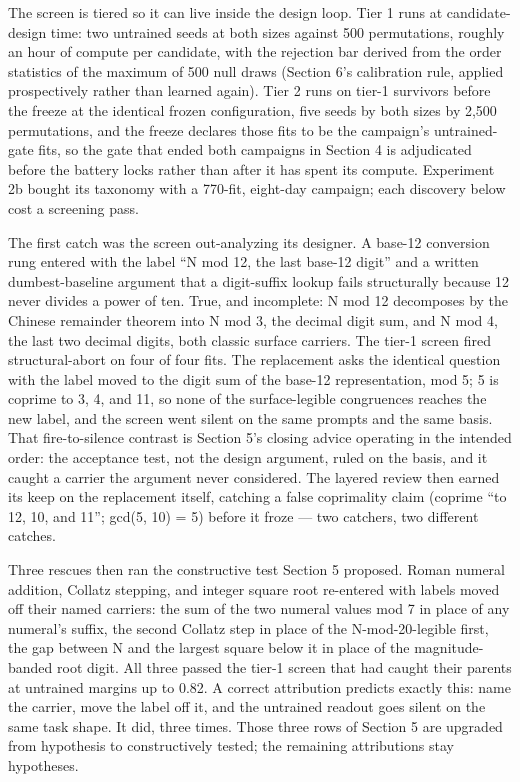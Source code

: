 The screen is tiered so it can live inside the design loop. Tier 1
runs at candidate-design time: two untrained seeds at both sizes
against 500 permutations, roughly an hour of compute per candidate,
with the rejection bar derived from the order statistics of the
maximum of 500 null draws (Section 6's calibration rule, applied
prospectively rather than learned again). Tier 2 runs on tier-1
survivors before the freeze at the identical frozen configuration,
five seeds by both sizes by 2,500 permutations, and the freeze
declares those fits to be the campaign's untrained-gate fits, so the
gate that ended both campaigns in Section 4 is adjudicated before the
battery locks rather than after it has spent its compute. Experiment
2b bought its taxonomy with a 770-fit, eight-day campaign; each
discovery below cost a screening pass.

The first catch was the screen out-analyzing its designer. A base-12
conversion rung entered with the label ``N mod 12, the last base-12
digit'' and a written dumbest-baseline argument that a digit-suffix
lookup fails structurally because 12 never divides a power of ten.
True, and incomplete: N mod 12 decomposes by the Chinese remainder
theorem into N mod 3, the decimal digit sum, and N mod 4, the last
two decimal digits, both classic surface carriers. The tier-1 screen
fired structural-abort on four of four fits. The replacement asks the
identical question with the label moved to the digit sum of the
base-12 representation, mod 5; 5 is coprime to 3, 4, and 11, so none
of the surface-legible congruences reaches the new label, and the
screen went silent on the same prompts and the same basis. That
fire-to-silence contrast is Section 5's closing advice operating in
the intended order: the acceptance test, not the design argument,
ruled on the basis, and it caught a carrier the argument never
considered. The layered review then earned its keep on the
replacement itself, catching a false coprimality claim (coprime ``to
12, 10, and 11''; gcd(5, 10) = 5) before it froze --- two catchers, two
different catches.

Three rescues then ran the constructive test Section 5 proposed.
Roman numeral addition, Collatz stepping, and integer square root
re-entered with labels moved off their named carriers: the sum of the
two numeral values mod 7 in place of any numeral's suffix, the second
Collatz step in place of the N-mod-20-legible first, the gap between
N and the largest square below it in place of the magnitude-banded
root digit. All three passed the tier-1 screen that had caught their
parents at untrained margins up to 0.82. A correct attribution
predicts exactly this: name the carrier, move the label off it, and
the untrained readout goes silent on the same task shape. It did,
three times. Those three rows of Section 5 are upgraded from
hypothesis to constructively tested; the remaining attributions stay
hypotheses.

